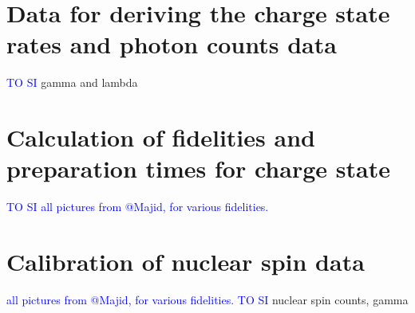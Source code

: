 \documentclass[%
 reprint,
superscriptaddress,
 amsmath,amssymb,
 aps,
]{revtex4-2}
\newcommand{\vvv}[1]{\textcolor{blue}{#1}}
\begin{document}
\section{Data for deriving the charge state rates and photon counts data}
\label{app:charge}
\vvv{TO SI}
gamma and lambda
\section{Calculation of fidelities and preparation times for charge state}
\label{app:charge_results}
\vvv{TO SI}
\vvv{all pictures from @Majid, for various fidelities.}
\section{Calibration of nuclear spin data}
\label{app:nuclear}
\vvv{all pictures from @Majid, for various fidelities.}
\vvv{TO SI}
nuclear spin counts, gamma


\end{document}
